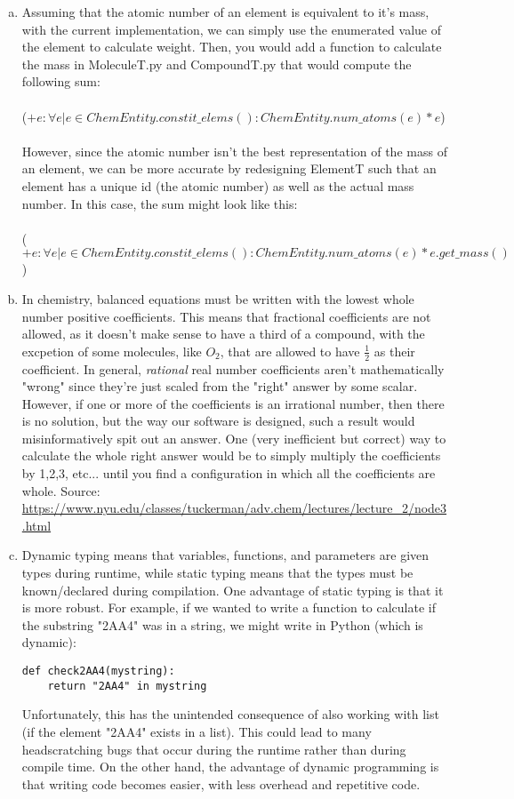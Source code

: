 \documentclass[12pt]{article}
\begin{document}
\begin{enumerate}[a)]
\item Assuming that the atomic number of an element is equivalent to it's mass, with the current implementation, we can simply use the enumerated value of the element to calculate weight. Then, you would add a function to calculate the mass in MoleculeT.py and CompoundT.py that would compute the following sum:\\\\
($+e : \forall e | e \in ChemEntity.constit\_elems() : ChemEntity.num\_atoms(e) * e$)
\\\\
However, since the atomic number isn't the best representation of the mass of an element, we can be more accurate by redesigning ElementT such that an element has a unique id (the atomic number) as well as the actual mass number. In this case, the sum might look like this:\\\\
($+e : \forall e | e \in ChemEntity.constit\_elems() : ChemEntity.num\_atoms(e) * e.get\_mass()$)
\\

\item In chemistry, balanced equations must be written with the lowest whole number positive coefficients. This means that fractional coefficients are not allowed, as it doesn't make sense to have a third of a compound, with the excpetion of some molecules, like $O_2$, that are allowed to have $\frac{1}{2}$ as their coefficient. In general, \emph{rational} real number coefficients aren't mathematically "wrong" since they're just scaled from the "right" answer by some scalar. However, if one or more of the coefficients is an irrational number, then there is no solution, but the way our software is designed, such a result would misinformatively spit out an answer. One (very inefficient but correct) way to calculate the whole right answer would be to simply multiply the coefficients by 1,2,3, etc... until you find a configuration in which all the coefficients are whole. Source: \url{https://www.nyu.edu/classes/tuckerman/adv.chem/lectures/lecture_2/node3.html}

\item Dynamic typing means that variables, functions, and parameters are given types during runtime, while static typing means that the types must be known/declared during compilation. One advantage of static typing is that it is more robust. For example, if we wanted to write a function to calculate if the substring "2AA4" was in a string, we might write in Python (which is dynamic):
\begin{lstlisting}
def check2AA4(mystring):
    return "2AA4" in mystring
\end{lstlisting}
Unfortunately, this has the unintended consequence of also working with list (if the element "2AA4" exists in a list). This could lead to many headscratching bugs that occur during the runtime rather than during compile time. On the other hand, the advantage of dynamic programming is that writing code becomes easier, with less overhead and repetitive code.


\end{enumerate}
\end{document}
